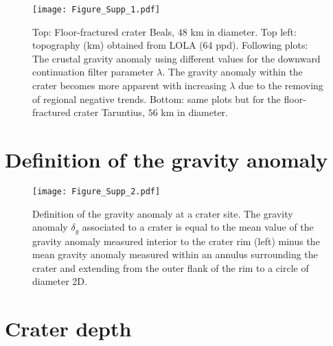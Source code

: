 \begin{figure}[h!]
  \graphicspath{ {/Users/thorey/Documents/These/Projet/FFC/Gravi_GRAIL/Article/Papier/SOUMISSION_2_EPSL/} }
  \begin{center}
    \texttt{[image: Figure\_Supp\_1.pdf]}
    \caption{Top: Floor-fractured  crater Beals, $48$ km  in diameter.
      Top  left:   topography  (km)  obtained  from   LOLA  (64  ppd).
      Following  plots: The  crustal gravity  anomaly using  different
      values for the downward continuation filter parameter $\lambda$.
      The gravity anomaly within the crater becomes more apparent with
      increasing $\lambda$  due to  the removing of  regional negative
      trends.  Bottom:  same plots but for  the floor-fractured crater
      Taruntius, $56$ km in diameter.}
    \label{Figure_Supp_1}
  \end{center}
\end{figure}
\clearpage
\section{Definition of the gravity anomaly}

\begin{figure}[h!]
  \graphicspath{ {/Users/thorey/Documents/These/Projet/FFC/Gravi_GRAIL/Article/Papier/SOUMISSION_2_EPSL/} }
  \begin{center}
    \texttt{[image: Figure\_Supp\_2.pdf]}
    \caption{Definition of the  gravity anomaly at a  crater site. The
      gravity anomaly  $\delta_g$ associated to  a crater is  equal to
      the mean value  of the gravity anomaly measured  interior to the
      crater rim (left) minus the mean gravity anomaly measured within
      an annulus surrounding  the crater and extending  from the outer
      flank of the rim to a circle of diameter 2D.}
    \label{Figure_Supp_2}
  \end{center}
\end{figure}

\section{Crater depth}

